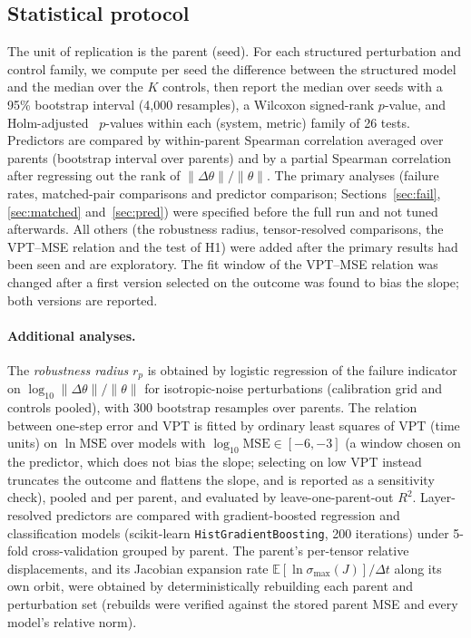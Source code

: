 \documentclass[11pt]{article}
\newcommand{\relnorm}{\|\Delta\theta\|/\|\theta\|}
\begin{document}
\subsection{Statistical protocol}\label{sec:stats}
The unit of replication is the parent (seed). For each structured perturbation and control family, we compute per seed the difference between the structured model and the median over the $K$ controls, then report the median over seeds with a 95\% bootstrap interval (4{,}000 resamples), a Wilcoxon signed-rank $p$-value, and Holm-adjusted~\cite{holm1979} $p$-values within each (system, metric) family of 26 tests. Predictors are compared by within-parent Spearman correlation averaged over parents (bootstrap interval over parents) and by a partial Spearman correlation after regressing out the rank of $\relnorm$. The primary analyses (failure rates, matched-pair comparisons and predictor comparison; Sections~\ref{sec:fail}, \ref{sec:matched} and~\ref{sec:pred}) were specified before the full run and not tuned afterwards. All others (the robustness radius, tensor-resolved comparisons, the VPT--MSE relation and the test of H1) were added after the primary results had been seen and are exploratory. The fit window of the VPT--MSE relation was changed after a first version selected on the outcome was found to bias the slope; both versions are reported.

\paragraph{Additional analyses.} The \emph{robustness radius} $r_p$ is obtained by logistic regression of the failure indicator on $\log_{10}\relnorm$ for isotropic-noise perturbations (calibration grid and controls pooled), with 300 bootstrap resamples over parents. The relation between one-step error and VPT is fitted by ordinary least squares of VPT (time units) on $\ln\mathrm{MSE}$ over models with $\log_{10}\mathrm{MSE}\in[-6,-3]$ (a window chosen on the predictor, which does not bias the slope; selecting on low VPT instead truncates the outcome and flattens the slope, and is reported as a sensitivity check), pooled and per parent, and evaluated by leave-one-parent-out $R^2$. Layer-resolved predictors are compared with gradient-boosted regression and classification models (scikit-learn \texttt{HistGradientBoosting}, 200 iterations) under 5-fold cross-validation grouped by parent. The parent's per-tensor relative displacements, and its Jacobian expansion rate $\mathbb{E}[\ln\sigma_{\max}(J)]/\Delta t$ along its own orbit, were obtained by deterministically rebuilding each parent and perturbation set (rebuilds were verified against the stored parent MSE and every model's relative norm).
\end{document}
